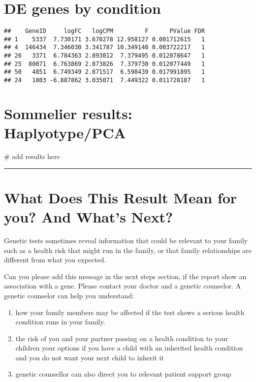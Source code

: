 \documentclass[
]{article}
\newenvironment{Shaded}{\begin{snugshade}}{\end{snugshade}}
\newcommand{\CommentTok}[1]{\textcolor[rgb]{0.48,0.49,0.49}{#1}}
\providecommand{\tightlist}{%
  \setlength{\itemsep}{0pt}\setlength{\parskip}{0pt}}
\begin{document}
\hypertarget{de-genes-by-condition}{%
\section{DE genes by condition}\label{de-genes-by-condition}}

\begin{verbatim}
##    GeneID     logFC   logCPM         F      PValue FDR
## 1    5337  7.730171 3.670278 12.958127 0.001712615   1
## 4  146434  7.346030 3.341787 10.349140 0.003722217   1
## 26   3371  6.784363 2.893012  7.379495 0.012078647   1
## 25  80071  6.763869 2.873826  7.379730 0.012077449   1
## 50   4851  6.749349 2.871517  6.598439 0.017991895   1
## 24   1803 -6.887862 3.035071  7.449322 0.011728187   1
\end{verbatim}

\hypertarget{sommelier-results-haplyotypepca}{%
\section{Sommelier results:
Haplyotype/PCA}\label{sommelier-results-haplyotypepca}}

\begin{Shaded}
\begin{Highlighting}[]
\CommentTok{\# add results here}
\end{Highlighting}
\end{Shaded}

\begin{center}\rule{0.5\linewidth}{0.5pt}\end{center}

\hypertarget{what-does-this-result-mean-for-you-and-whats-next}{%
\section{What Does This Result Mean for you? And What's
Next?}\label{what-does-this-result-mean-for-you-and-whats-next}}

Genetic tests sometimes reveal information that could be relevant to
your family such as a health risk that might run in the family, or that
family relationships are different from what you expected.

Can you please add this message in the next steps section, if the report
show an association with a gene. Please contact your doctor and a
genetic counselor. A genetic counselor can help you understand:

\begin{enumerate}
\def\labelenumi{\arabic{enumi}.}
\tightlist
\item
  how your family members may be affected if the test shows a serious
  health condition runs in your family.
\item
  the risk of you and your partner passing on a health condition to your
  children your options if you have a child with an inherited health
  condition and you do not want your next child to inherit it
\item
  genetic counsellor can also direct you to relevant patient support
  group
\end{enumerate}
\end{document}
